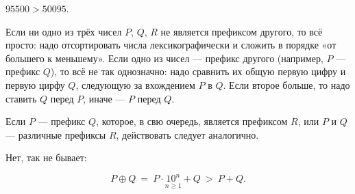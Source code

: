 \begin{itemize}
\itA $95500 > 50095$.

\itB Если ни одно из трёх чисел $P$, $Q$, $R$ не является префиксом другого, то всё просто: надо отсортировать числа лексикографически и сложить в порядке «от большего к меньшему». Если одно из чисел — префикс другого (например, $P$ — префикс $Q$), то всё не так однозначно: надо сравнить их общую первую цифру и первую цирфу $Q$, следующую за вхождением $P$ в $Q$. Если второе больше, то надо ставить $Q$ перед $P$, иначе — $P$ перед $Q$.

\ms Если $P$ — префикс $Q$, которое, в свю очередь, является префиксом $R$, или $P$ и $Q$ — различные префиксы $R$, действовать следует аналогично.

\itC Нет, так не бывает:

$$P \oplus Q\ =\ P \cdot \underset{n\geq1}{10^n} + Q\ >\ P+Q.$$
\end{itemize}